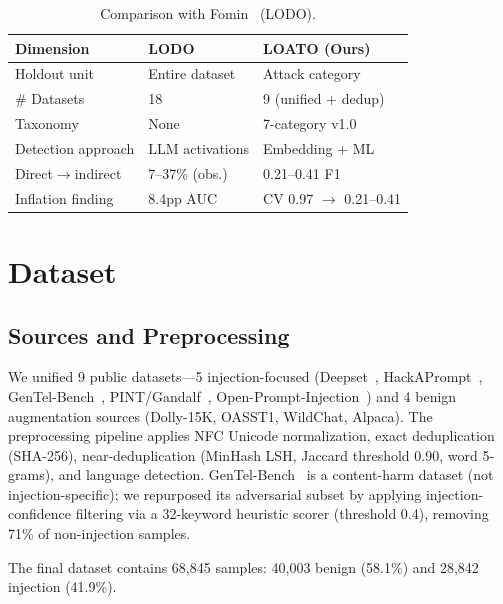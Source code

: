 \documentclass[conference]{IEEEtran}
\newcommand{\Fone}{F1}
\begin{document}
\begin{table}[t]
\centering
\footnotesize
\caption{Comparison with Fomin~\cite{fomin2026benchmarks} (LODO).}
\label{tab:fomin}
\begin{tabular}{lll}
\toprule
\textbf{Dimension} & \textbf{LODO} & \textbf{LOATO (Ours)} \\
\midrule
Holdout unit & Entire dataset & Attack category \\
\# Datasets & 18 & 9 (unified + dedup) \\
Taxonomy & None & 7-category v1.0 \\
Detection approach & LLM activations & Embedding + ML \\
Direct$\to$indirect & 7--37\% (obs.) & 0.21--0.41 \Fone{} \\
Inflation finding & 8.4pp AUC & CV 0.97 $\to$ 0.21--0.41 \\
\bottomrule
\end{tabular}
\end{table}

\section{Dataset}
\label{sec:dataset}

\subsection{Sources and Preprocessing}

We unified 9 public datasets---5 injection-focused
(Deepset~\cite{deepset2023promptinjections},
HackAPrompt~\cite{schulhoff2023hackaprompt},
GenTel-Bench~\cite{gentel2024bench},
PINT/Gandalf~\cite{lakera2023gandalf},
Open-Prompt-Injection~\cite{liu2024formalizing}) and 4 benign augmentation
sources (Dolly-15K, OASST1, WildChat, Alpaca). The preprocessing pipeline
applies NFC Unicode normalization, exact deduplication (SHA-256),
near-deduplication (MinHash LSH, Jaccard threshold 0.90, word 5-grams), and
language detection. GenTel-Bench~\cite{gentel2024bench} is a content-harm
dataset (not injection-specific); we repurposed its adversarial subset by
applying injection-confidence filtering via a 32-keyword heuristic scorer
(threshold 0.4), removing 71\% of non-injection samples.

The final dataset contains 68,845 samples: 40,003 benign (58.1\%) and 28,842
injection (41.9\%).
\end{document}
